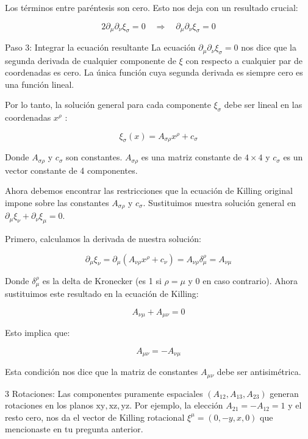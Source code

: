 Los términos entre paréntesis son cero. Esto nos deja con un resultado crucial:

$$
2 \partial_\mu \partial_\nu \xi_\sigma=0 \quad \Longrightarrow \quad \partial_\mu \partial_\nu \xi_\sigma=0
$$


Paso 3: Integrar la ecuación resultante
La ecuación $\partial_\mu \partial_\nu \xi_\sigma=0$ nos dice que la segunda derivada de cualquier componente de $\xi$ con respecto a cualquier par de coordenadas es cero. La única función cuya segunda derivada es siempre cero es una función lineal.

Por lo tanto, la solución general para cada componente $\xi_\sigma$ debe ser lineal en las coordenadas $x^\rho$ :

$$
\xi_\sigma(x)=A_{\sigma \rho} x^\rho+c_\sigma
$$


Donde $A_{\sigma \rho}$ y $c_\sigma$ son constantes. $A_{\sigma \rho}$ es una matriz constante de $4 \times 4$ y $c_\sigma$ es un vector constante de 4 componentes.

Ahora debemos encontrar las restricciones que la ecuación de Killing original impone sobre las constantes $A_{\sigma \rho}$ y $c_\sigma$. Sustituimos nuestra solución general en $\partial_\mu \xi_\nu+\partial_\nu \xi_\mu=0$.

Primero, calculamos la derivada de nuestra solución:

$$
\partial_\mu \xi_\nu=\partial_\mu\left(A_{\nu \rho} x^\rho+c_\nu\right)=A_{\nu \rho} \delta_\mu^\rho=A_{\nu \mu}
$$


Donde $\delta_\mu^\rho$ es la delta de Kronecker (es 1 si $\rho=\mu$ y 0 en caso contrario).
Ahora sustituimos este resultado en la ecuación de Killing:

$$
A_{\nu \mu}+A_{\mu \nu}=0
$$


Esto implica que:

$$
A_{\mu \nu}=-A_{\nu \mu}
$$


Esta condición nos dice que la matriz de constantes $A_{\mu \nu}$ debe ser antisimétrica.

3 Rotaciones: Las componentes puramente espaciales $\left(A_{12}, A_{13}, A_{23}\right)$ generan rotaciones en los planos $\mathrm{xy}, \mathrm{xz}, \mathrm{yz}$. Por ejemplo, la elección $A_{21}=-A_{12}=1$ y el resto cero, nos da el vector de Killing rotacional $\xi^\mu=(0,-y, x, 0)$ que mencionaste en tu pregunta anterior.


